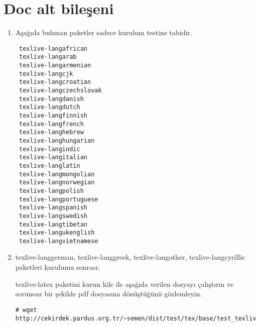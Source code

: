 \documentclass[a4paper,10pt]{article}
\begin{document}
\section{Doc alt bileşeni} 
\begin{enumerate}
 \item Aşağıda bulunan paketler sadece kurulum testine tabidir.
\begin{verbatim}
 texlive-langafrican
 texlive-langarab
 texlive-langarmenian
 texlive-langcjk
 texlive-langcroatian
 texlive-langczechslovak
 texlive-langdanish
 texlive-langdutch
 texlive-langfinnish
 texlive-langfrench
 texlive-langhebrew
 texlive-langhungarian
 texlive-langindic
 texlive-langitalian
 texlive-langlatin
 texlive-langmongolian
 texlive-langnorwegian
 texlive-langpolish
 texlive-langportuguese
 texlive-langspanish
 texlive-langswedish
 texlive-langtibetan
 texlive-langukenglish
 texlive-langvietnamese
\end{verbatim}
\item  texlive-langgerman, texlive-langgreek, texlive-langother, texlive-langcyrillic paketleri kurulumu sonrası:

texlive-latex paketini kurun kile ile aşağıda verilen dosyayı çalıştırın ve sorunsuz bir şekilde pdf dosyasına dönüştüğünü gözlemleyin.

\begin{verbatim}
# wget http://cekirdek.pardus.org.tr/~semen/dist/test/tex/base/test_texlivelatex.tex
\end{verbatim}

\end{enumerate}
\end{document}
